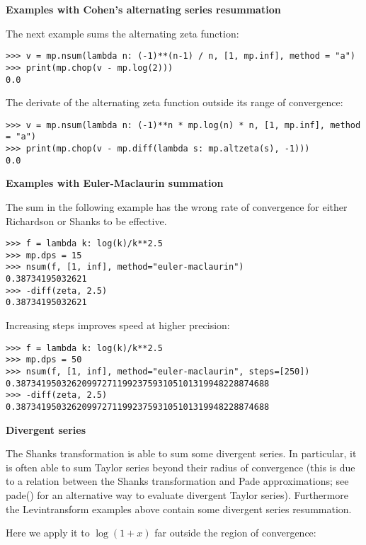 \vpara
\textbf{Examples with Cohen's alternating series resummation}

The next example sums the alternating zeta function:


\begin{lstlisting}
>>> v = mp.nsum(lambda n: (-1)**(n-1) / n, [1, mp.inf], method = "a")
>>> print(mp.chop(v - mp.log(2)))
0.0
\end{lstlisting}

The derivate of the alternating zeta function outside its range of
convergence:

\begin{lstlisting}
>>> v = mp.nsum(lambda n: (-1)**n * mp.log(n) * n, [1, mp.inf], method = "a")
>>> print(mp.chop(v - mp.diff(lambda s: mp.altzeta(s), -1)))
0.0
\end{lstlisting}

\vpara
\textbf{Examples with Euler-Maclaurin summation}

The sum in the following example has the wrong rate of convergence for either Richardson or Shanks to be effective.


\begin{lstlisting}
>>> f = lambda k: log(k)/k**2.5
>>> mp.dps = 15
>>> nsum(f, [1, inf], method="euler-maclaurin")
0.38734195032621
>>> -diff(zeta, 2.5)
0.38734195032621
\end{lstlisting}

Increasing steps improves speed at higher precision:

\begin{lstlisting}
>>> f = lambda k: log(k)/k**2.5
>>> mp.dps = 50
>>> nsum(f, [1, inf], method="euler-maclaurin", steps=[250])
0.38734195032620997271199237593105101319948228874688
>>> -diff(zeta, 2.5)
0.38734195032620997271199237593105101319948228874688
\end{lstlisting}

\vpara
\textbf{Divergent series}

The Shanks transformation is able to sum some divergent series. In particular, it is often able to sum Taylor series beyond their radius of convergence (this is due to a relation between the Shanks transformation and Pade approximations; see pade() for an alternative way to evaluate divergent Taylor series). Furthermore the Levintransform
examples above contain some divergent series resummation.

Here we apply it to $\log(1+x)$ far outside the region of convergence:

